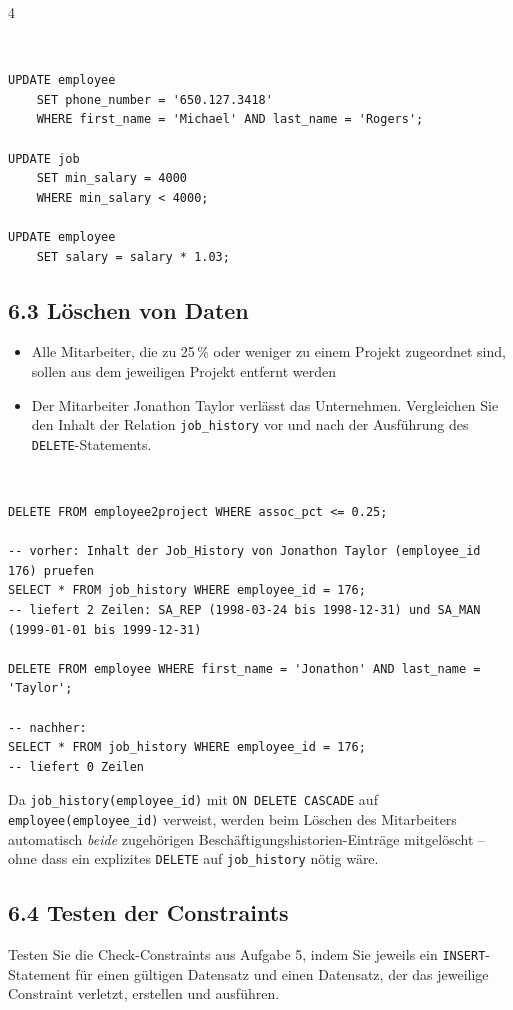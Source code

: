 \documentclass[8pt,a4paper]{extarticle}
\newenvironment{loesung}[1][]{%
    \par\noindent{\bfseries\color{loesungrahmen}\small$\blacktriangleright$~L\"osung#1:}~%
}{\par\smallskip}
\begin{document}
\begin{multicols}{4}
\begin{loesung}
\begin{lstlisting}
UPDATE employee
    SET phone_number = '650.127.3418'
    WHERE first_name = 'Michael' AND last_name = 'Rogers';

UPDATE job
    SET min_salary = 4000
    WHERE min_salary < 4000;

UPDATE employee
    SET salary = salary * 1.03;
\end{lstlisting}
\end{loesung}

\subsection*{6.3 \quad L\"oschen von Daten}
\begin{itemize}
\item Alle Mitarbeiter, die zu 25\,\% oder weniger zu einem Projekt zugeordnet sind, sollen aus dem jeweiligen Projekt entfernt werden
\item Der Mitarbeiter Jonathon Taylor verl\"asst das Unternehmen. Vergleichen Sie den Inhalt der Relation \texttt{job\_history} vor und nach der Ausf\"uhrung des \texttt{DELETE}-Statements.
\end{itemize}

\begin{loesung}
\begin{lstlisting}
DELETE FROM employee2project WHERE assoc_pct <= 0.25;

-- vorher: Inhalt der Job_History von Jonathon Taylor (employee_id 176) pruefen
SELECT * FROM job_history WHERE employee_id = 176;
-- liefert 2 Zeilen: SA_REP (1998-03-24 bis 1998-12-31) und SA_MAN (1999-01-01 bis 1999-12-31)

DELETE FROM employee WHERE first_name = 'Jonathon' AND last_name = 'Taylor';

-- nachher:
SELECT * FROM job_history WHERE employee_id = 176;
-- liefert 0 Zeilen
\end{lstlisting}
Da \texttt{job\_history(employee\_id)} mit \texttt{ON DELETE CASCADE} auf \texttt{employee(employee\_id)} verweist, werden beim L\"oschen des Mitarbeiters automatisch \emph{beide} zugeh\"origen Besch\"aftigungshistorien-Eintr\"age mitgel\"oscht -- ohne dass ein explizites \texttt{DELETE} auf \texttt{job\_history} n\"otig w\"are.
\end{loesung}

\subsection*{6.4 \quad Testen der Constraints}
Testen Sie die Check-Constraints aus Aufgabe 5, indem Sie jeweils ein \texttt{INSERT}-Statement f\"ur einen g\"ultigen Datensatz und einen Datensatz, der das jeweilige Constraint verletzt, erstellen und ausf\"uhren.


\end{multicols}
\end{document}
